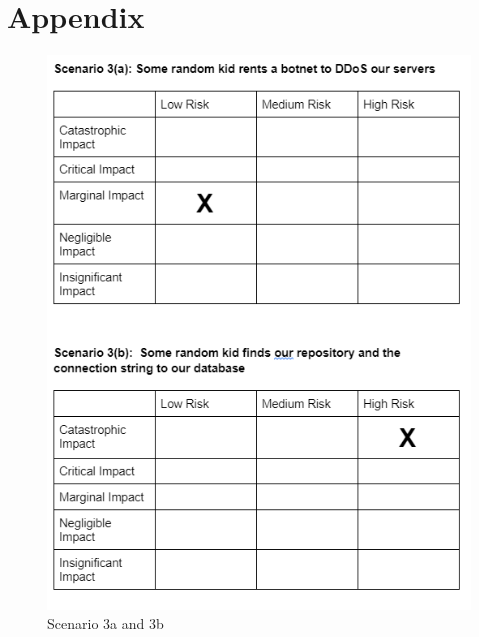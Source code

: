\documentclass{article}
\begin{document}
\section{Appendix}
\begin{figure}[h!]
    \centering
    \includegraphics[scale=0.5]{images/risk_1.PNG}
    \caption{ Scenario 3a and 3b }
\end{figure}
\end{document}
